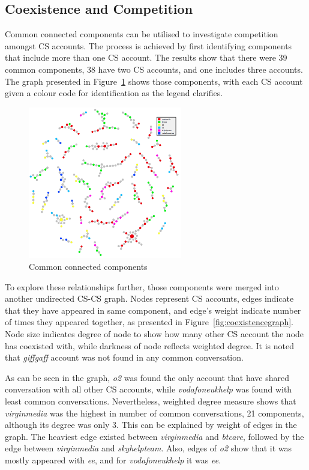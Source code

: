 \documentclass[sigconf]{acmart}
\begin{document}
\subsection{Coexistence and Competition}

Common connected components can be utilised to investigate competition
amongst CS accounts. The process is achieved by first identifying
components that include more than one CS account. The results show
that there were 39 common components, 38 have two CS accounts, and one
includes three accounts. The graph presented in
Figure~\ref{fig:commoncc} shows those components, with each CS account
given a colour code for identification as the legend clarifies.

\begin{figure}[htb]
\centering
\includegraphics[width=0.6\textwidth]{images/commoncc.png}
\caption{Common connected components}
\label{fig:commoncc}
\end{figure}

To explore these relationships further, those components were merged
into another undirected CS-CS graph. Nodes represent CS accounts,
edges indicate that they have appeared in same component, and edge's
weight indicate number of times they appeared together, as presented
in Figure~\ref{fig:coexistencegraph}. Node size indicates degree of
node to show how many other CS account the node has coexisted with,
while darkness of node reflects weighted degree. It is noted that
{\emph{giffgaff}} account was not found in any common conversation.

As can be seen in the graph, {\emph{o2}} was found the only account
that have shared conversation with all other CS accounts, while
{\emph{vodafoneukhelp}} was found with least common
conversations. Nevertheless, weighted degree measure shows that
{\emph{virginmedia}} was the highest in number of common
conversations, 21 components, although its degree was only 3. This can
be explained by weight of edges in the graph. The heaviest edge
existed between {\emph{virginmedia}} and {\emph{btcare}}, followed by
the edge between {\emph{virginmedia}} and {\emph{skyhelpteam}}. Also,
edges of {\emph{o2}} show that it was mostly appeared with
{\emph{ee}}, and for {\emph{vodafoneukhelp}} it was {\emph{ee}}.
\end{document}
